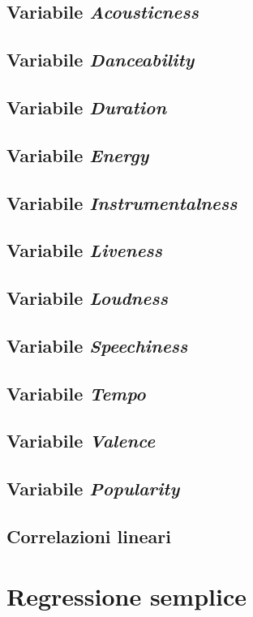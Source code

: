 \documentclass[fleqn,10pt]{SelfArx} %
\begin{document}
\subsection*{Variabile \textit{Acousticness}}
\subsection*{Variabile \textit{Danceability}}
\subsection*{Variabile \textit{Duration}}
\subsection*{Variabile \textit{Energy}}
\subsection*{Variabile \textit{Instrumentalness}}
\subsection*{Variabile \textit{Liveness}}
\subsection*{Variabile \textit{Loudness}}
\subsection*{Variabile \textit{Speechiness}}
\subsection*{Variabile \textit{Tempo}}
\subsection*{Variabile \textit{Valence}}
\subsection*{Variabile \textit{Popularity}}
\subsection{Correlazioni lineari}
\section{Regressione semplice}
\end{document}
